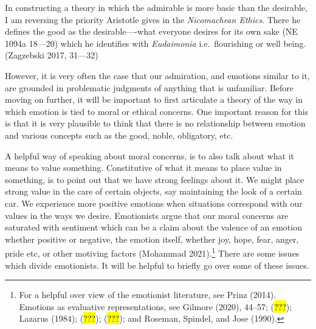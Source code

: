 \documentclass[
  letterpaper,
  DIV=11,
  numbers=noendperiod]{scrartcl}
\theoremstyle{remark}
\begin{document}
In constructing a theory in which the admirable is more basic than the
desirable, I am reversing the priority Aristotle gives in the
\emph{Nicomachean Ethics}. There he defines the good as the
desirable----what everyone desires for its own sake (NE 1094a 18---20)
which he identifies with \emph{Eudaimonia} i.e.~flourishing or well
being. (Zagzebski 2017, 31---32)

However, it is very often the case that our admiration, and emotions
similar to it, are grounded in problematic judgments of anything that is
unfamiliar. Before moving on further, it will be important to first
articulate a theory of the way in which emotion is tied to moral or
ethical concerns. One important reason for this is that it is very
plausible to think that there is no relationship between emotion and
various concepts such as the good, noble, obligatory, etc.

A helpful way of speaking about moral concerns, is to also talk about
what it means to value something. Constitutive of what it means to place
value in something, is to point out that we have strong feelings about
it. We might place strong value in the care of certain objects, say
maintaining the look of a certain car. We experience more positive
emotions when situations correspond with our values in the ways we
desire. Emotionists argue that our moral concerns are saturated with
sentiment which can be a claim about the valence of an emotion whether
positive or negative, the emotion itself, whether joy, hope, fear,
anger, pride etc, or other motiving factors (Mohammad 2021).\footnote{For
  a helpful over view of the emotionist literature, see Prinz (2014).
  Emotions as evaluative representations, see Gilmore (2020), 44--57;
  (\hl{???}); Lazarus (1984); (\hl{???}); (\hl{???}); and Roseman,
  Spindel, and Jose (1990).} There are some issues which divide
emotionists. It will be helpful to briefly go over some of these issues.
\end{document}
